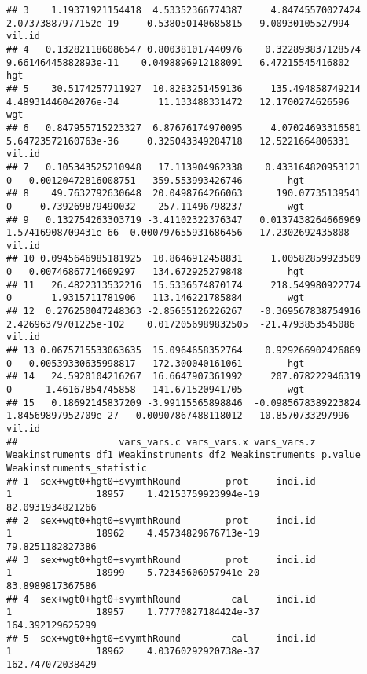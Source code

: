 \documentclass[
]{book}
\begin{document}
\begin{verbatim}
## 3    1.19371921154418  4.53352366774387     4.84745570027424  2.07373887977152e-19     0.538050140685815   9.00930105527994     vil.id
## 4   0.132821186086547 0.800381017440976    0.322893837128574  9.66146445882893e-11    0.0498896912188091   6.47215545416802        hgt
## 5    30.5174257711927  10.8283251459136     135.494858749214  4.48931446042076e-34       11.133488331472   12.1700274626596        wgt
## 6   0.847955715223327  6.87676174970095     4.07024693316581  5.64723572160763e-36     0.325043349284718   12.5221664806331     vil.id
## 7   0.105343525210948   17.113904962338    0.433164820953121                     0   0.00120472816008751   359.553993426746        hgt
## 8    49.7632792630648  20.0498764266063      190.07735139541                     0     0.739269879490032    257.11496798237        wgt
## 9   0.132754263303719 -3.41102322376347   0.0137438264666969  1.57416908709431e-66  0.000797655931686456   17.2302692435808     vil.id
## 10 0.0945646985181925  10.8646912458831     1.00582859923509                     0   0.00746867714609297   134.672925279848        hgt
## 11   26.4822313532216  15.5336574870174     218.549980922774                     0       1.9315711781906   113.146221785884        wgt
## 12  0.276250047248363 -2.85655126226267   -0.369567838754916 2.42696379701225e-102    0.0172056989832505  -21.4793853545086     vil.id
## 13 0.0675715533063635  15.0964658352764    0.929266902426869                     0   0.00539330635998817   172.300040161061        hgt
## 14   24.5920104216267  16.6647907361992     207.078222946319                     0      1.46167854745858   141.671520941705        wgt
## 15   0.18692145837209 -3.99115565898846  -0.0985678389223824  1.84569897952709e-27   0.00907867488118012  -10.8570733297996     vil.id
##                  vars_vars.c vars_vars.x vars_vars.z Weakinstruments_df1 Weakinstruments_df2 Weakinstruments_p.value Weakinstruments_statistic
## 1  sex+wgt0+hgt0+svymthRound        prot     indi.id                   1               18957    1.42153759923994e-19          82.0931934821266
## 2  sex+wgt0+hgt0+svymthRound        prot     indi.id                   1               18962    4.45734829676713e-19          79.8251182827386
## 3  sex+wgt0+hgt0+svymthRound        prot     indi.id                   1               18999    5.72345606957941e-20          83.8989817367586
## 4  sex+wgt0+hgt0+svymthRound         cal     indi.id                   1               18957    1.77770827184424e-37          164.392129625299
## 5  sex+wgt0+hgt0+svymthRound         cal     indi.id                   1               18962    4.03760292920738e-37          162.747072038429

\end{verbatim}
\end{document}
